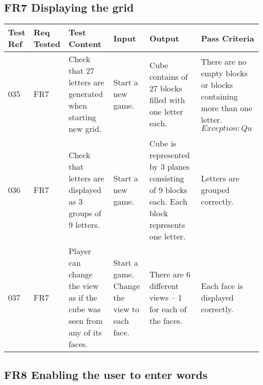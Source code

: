 \documentclass{project}
\begin{document}
\subsection{FR7 Displaying the grid}

\begin{longtable}{|p{0.7cm}|p{1cm}|p{3.5cm}|p{3.2cm}|p{3.5cm}|p{3.5cm}|}
\hline
Test Ref & Req Tested & Test Content & Input  & Output & Pass Criteria \\ \hline \hline


035 & FR7 & Check that 27 letters are generated when starting new grid. & Start a new game. & Cube contains of 27 blocks filled with one letter each. 
& There are no empty blocks or blocks containing more than one letter. \( Exception: Qu \)  \\ \hline

036 & FR7 & Check that letters are displayed as 3 groups of 9 letters. & Start a new game. & Cube is represented by 3 planes consisting of 9 blocks each. Each block represents one letter.
& Letters are grouped correctly. \\ \hline 

037 & FR7 & Player can change the view as if the cube was seen from any of its faces. & Start a game. Change the view to each face.  
& There are 6 different views – 1 for each of the faces. & Each face is displayed correctly. \\ \hline

\end{longtable}

\subsection{FR8 Enabling the user to enter words}
\end{document}
